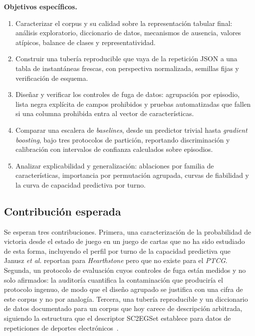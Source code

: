 \documentclass[conference]{IEEEtran}
\begin{document}
\noindent\textbf{Objetivos espec\'ificos.}
\begin{enumerate}
  \item Caracterizar el corpus y su calidad sobre la representaci\'on
        tabular final: an\'alisis exploratorio, diccionario de datos,
        mecanismos de ausencia, valores at\'ipicos, balance de clases y
        representatividad.
  \item Construir una tuber\'ia reproducible que vaya de la repetici\'on
        JSON a una tabla de instant\'aneas frescas, con perspectiva
        normalizada, semillas fijas y verificaci\'on de esquema.
  \item Dise\~nar y verificar los controles de fuga de datos: agrupaci\'on
        por episodio, lista negra expl\'icita de campos prohibidos y
        pruebas automatizadas que fallen si una columna prohibida entra al
        vector de caracter\'isticas.
  \item Comparar una escalera de \emph{baselines}, desde un predictor
        trivial hasta \emph{gradient boosting}, bajo tres protocolos de
        partici\'on, reportando discriminaci\'on y calibraci\'on con
        intervalos de confianza calculados sobre episodios.
  \item Analizar explicabilidad y generalizaci\'on: ablaciones por familia
        de caracter\'isticas, importancia por permutaci\'on agrupada,
        curvas de fiabilidad y la curva de capacidad predictiva por turno.
\end{enumerate}

\subsection{Contribuci\'on esperada}
\label{subsec:contribution}

Se esperan tres contribuciones. Primera, una caracterizaci\'on de la
probabilidad de victoria desde el estado de juego en un juego de cartas que
no ha sido estudiado de esta forma, incluyendo el perfil por turno de la
capacidad predictiva que Janusz \textit{et al.} reportan para
\emph{Hearthstone} pero que no existe para el \emph{PTCG}. Segunda, un
protocolo de evaluaci\'on cuyos controles de fuga est\'an medidos y no
solo afirmados: la auditor\'ia cuantifica la contaminaci\'on que
producir\'ia el protocolo ingenuo, de modo que el dise\~no agrupado se
justifica con una cifra de este corpus y no por analog\'ia. Tercera, una
tuber\'ia reproducible y un diccionario de datos documentado para un corpus
que hoy carece de descripci\'on arbitrada, siguiendo la estructura que el
descriptor SC2EGSet establece para datos de repeticiones de deportes
electr\'onicos~\cite{bialecki_sc2egset_2023}.
\end{document}
